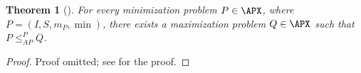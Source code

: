 \documentclass[]{article}
\theoremstyle{plain}
\newtheorem{theorem}{Theorem}
\newtheorem{todo}{TODO}
\theoremstyle{definition}
\newcommand{\APr}{\leq_{AP}^{P}}
\newcommand{\ceil}[1]{\lceil{#1}\rceil}
\begin{document}
\begin{theorem}[{\cite[Theorem~8.7]{book}}]\label{thm:minmax}
  For every minimization problem $P \in \APX$, where $P = (I, S, m_P, \min)$, there exists a maximization problem $Q \in \APX$ such that $P \APr Q$.
\end{theorem}
\begin{proof}
  Proof omitted; see \cite{book} for the proof.
\end{proof}


\end{document}
